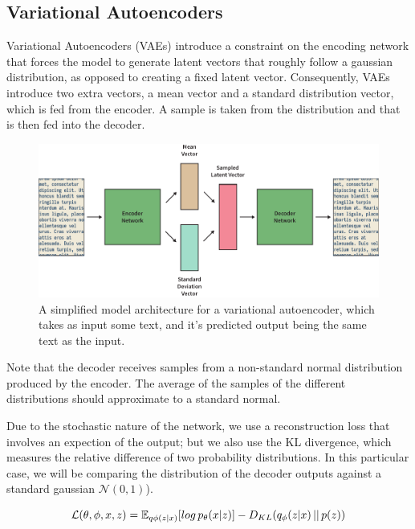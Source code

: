 \documentclass[12pt,twoside]{report}
\begin{document}
\subsection{Variational Autoencoders}

Variational Autoencoders (VAEs) introduce a constraint on the encoding network that forces the model to generate latent vectors that roughly follow a gaussian distribution, as opposed to creating a fixed latent vector. Consequently, VAEs introduce two extra vectors, a mean vector and a standard distribution vector, which is fed from the encoder. A sample is taken from the distribution and that is then fed into the decoder.

\begin{figure}[!ht]
      
	\centering
	\includegraphics[width=150mm]{diagrams/variational_autoencoders.pdf}
	\caption{A simplified model architecture for a variational autoencoder, which takes as input some text, and it's predicted output being the same text as the input.\label{vae}}
  \end{figure}

  Note that the decoder receives samples from a non-standard normal distribution produced by the encoder. The average of the samples of the different distributions should approximate to a standard normal.
  
  Due to the stochastic nature of the network, we use a reconstruction loss that involves an expection of the output; but we also use the KL divergence, which  measures the relative difference of two probability distributions. In this particular case, we will be comparing the distribution of the decoder outputs against a standard gaussian $ \mathcal{N}(0,1)$).
  
  $$\mathcal{L}(\theta, \phi, x, z) = \mathbb{E}_{q \phi (z|x)}[log \thinspace p_{\theta}(x|z)] - D_{KL}(q_{\phi}(z|x)\thinspace||\thinspace p(z)) $$
\end{document}
